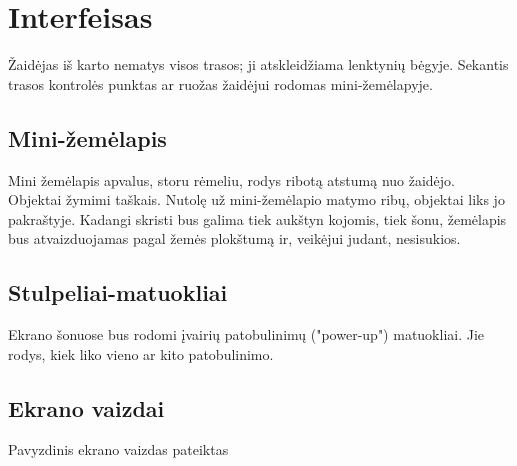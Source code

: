 \section{Interfeisas}

Žaidėjas iš karto nematys visos trasos; ji atskleidžiama lenktynių bėgyje.
Sekantis trasos kontrolės punktas ar ruožas žaidėjui rodomas mini-žemėlapyje.

\subsection{Mini-žemėlapis}

Mini žemėlapis apvalus, storu rėmeliu, rodys ribotą atstumą nuo žaidėjo.
Objektai žymimi taškais.
Nutolę už mini-žemėlapio matymo ribų, objektai liks jo pakraštyje.
Kadangi skristi bus galima tiek aukštyn kojomis, tiek šonu, žemėlapis bus atvaizduojamas pagal žemės plokštumą ir, veikėjui judant, nesisukios.

\subsection{Stulpeliai-matuokliai}

Ekrano šonuose bus rodomi įvairių patobulinimų ("power-up") matuokliai.
Jie rodys, kiek liko vieno ar kito patobulinimo.

\subsection{Ekrano vaizdai}

Pavyzdinis ekrano vaizdas pateiktas 

